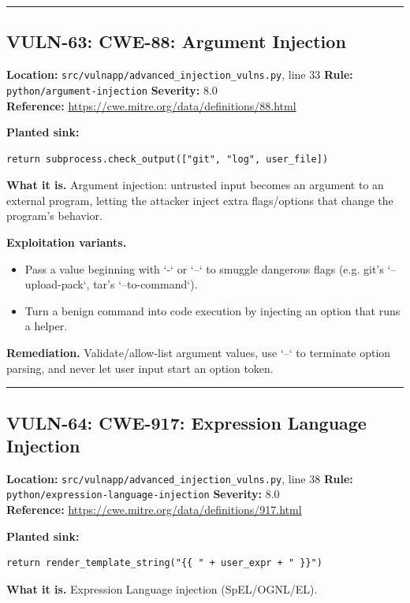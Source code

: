 \documentclass[11pt,a4paper]{article}
\begin{document}
\vspace{4pt}\hrule\vspace{6pt}
\subsection{VULN-63: CWE-88: Argument Injection}
\noindent\textbf{Location:} \texttt{src/vulnapp/advanced\_injection\_vulns.py}, line 33 \quad \textbf{Rule:} \texttt{python/argument-injection} \quad \textbf{Severity:} 8.0
\\ \textbf{Reference:} \url{https://cwe.mitre.org/data/definitions/88.html}

\noindent\textbf{Planted sink:}
\begin{lstlisting}
return subprocess.check_output(["git", "log", user_file])
\end{lstlisting}
\noindent\textbf{What it is.} Argument injection: untrusted input becomes an argument to an external program, letting the attacker inject extra flags/options that change the program's behavior.

\noindent\textbf{Exploitation variants.}
\begin{itemize}[leftmargin=1.4em,itemsep=1pt,topsep=2pt]
\item Pass a value beginning with `-` or `--` to smuggle dangerous flags (e.g. git's `--upload-pack`, tar's `--to-command`).
\item Turn a benign command into code execution by injecting an option that runs a helper.
\end{itemize}
\noindent\textbf{Remediation.} Validate/allow-list argument values, use `--` to terminate option parsing, and never let user input start an option token.

\vspace{4pt}\hrule\vspace{6pt}
\subsection{VULN-64: CWE-917: Expression Language Injection}
\noindent\textbf{Location:} \texttt{src/vulnapp/advanced\_injection\_vulns.py}, line 38 \quad \textbf{Rule:} \texttt{python/expression-language-injection} \quad \textbf{Severity:} 8.0
\\ \textbf{Reference:} \url{https://cwe.mitre.org/data/definitions/917.html}

\noindent\textbf{Planted sink:}
\begin{lstlisting}
return render_template_string("{{ " + user_expr + " }}")
\end{lstlisting}
\noindent\textbf{What it is.} Expression Language injection (SpEL/OGNL/EL).
\end{document}
